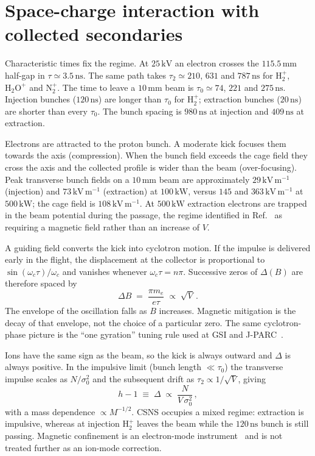 \documentclass[hyperref]{cernrep}
\begin{document}
\section{Space-charge interaction with collected secondaries}
\label{sec:mech}

Characteristic times fix the regime. At $25\,\mathrm{kV}$ an electron
crosses the $115.5\,\mathrm{mm}$ half-gap in
$\tau\simeq 3.5\,\mathrm{ns}$. The same path takes
$\tau_2\simeq 210$, $631$ and $787\,\mathrm{ns}$ for $\mathrm{H}_2^+$,
$\mathrm{H}_2\mathrm{O}^+$ and $\mathrm{N}_2^+$. The time to leave a
$10\,\mathrm{mm}$ beam is $\tau_0\simeq 74$, $221$ and
$275\,\mathrm{ns}$. Injection bunches ($120\,\mathrm{ns}$) are longer
than $\tau_0$ for $\mathrm{H}_2^+$; extraction bunches
($20\,\mathrm{ns}$) are shorter than every $\tau_0$. The bunch spacing
is $980\,\mathrm{ns}$ at injection and $409\,\mathrm{ns}$ at extraction.

Electrons are attracted to the proton bunch. A moderate kick focuses them
towards the axis (compression). When the bunch field exceeds the cage
field they cross the axis and the collected profile is wider than the
beam (over-focusing). Peak transverse bunch fields on a $10\,\mathrm{mm}$
beam are approximately $29\,\mathrm{kV\,m^{-1}}$ (injection) and
$73\,\mathrm{kV\,m^{-1}}$ (extraction) at $100\,\mathrm{kW}$, versus
$145$ and $363\,\mathrm{kV\,m^{-1}}$ at $500\,\mathrm{kW}$; the cage
field is $108\,\mathrm{kV\,m^{-1}}$. At $500\,\mathrm{kW}$ extraction
electrons are trapped in the beam potential during the passage, the
regime identified in Ref.~\cite{Vilsmeier2019} as requiring a magnetic
field rather than an increase of $V$.

A guiding field converts the kick into cyclotron motion. If the impulse
is delivered early in the flight, the displacement at the collector is
proportional to $\sin(\omega_c\tau)/\omega_c$ and vanishes whenever
$\omega_c\tau=n\pi$. Successive zeros of $\Delta(B)$ are therefore spaced
by
\begin{equation}
\label{eq:dB}
\Delta B \;=\; \frac{\pi m_e}{e\tau}
\;\propto\; \sqrt{V}\,.
\end{equation}
The envelope of the oscillation falls as $B$ increases. Magnetic
mitigation is the decay of that envelope, not the choice of a particular
zero. The same cyclotron-phase picture is the ``one gyration'' tuning
rule used at GSI and J-PARC~\cite{Forck2011,Satou2010}.

Ions have the same sign as the beam, so the kick is always outward and
$\Delta$ is always positive. In the impulsive limit
(bunch length $\ll\tau_0$) the transverse impulse scales as
$N/\sigma_0^2$ and the subsequent drift as
$\tau_2\propto 1/\sqrt{V}$, giving~\cite{Shiltsev2021}
\begin{equation}
\label{eq:h}
h-1 \;\equiv\; \Delta
\;\propto\; \frac{N}{V\,\sigma_0^2}\,,
\end{equation}
with a mass dependence $\propto M^{-1/2}$. CSNS occupies a mixed
regime: extraction is impulsive, whereas at injection $\mathrm{H}_2^+$
leaves the beam while the $120\,\mathrm{ns}$ bunch is still passing.
Magnetic confinement is an electron-mode instrument~\cite{Vilsmeier2019,Shiltsev2021}
and is not treated further as an ion-mode correction.
\end{document}
